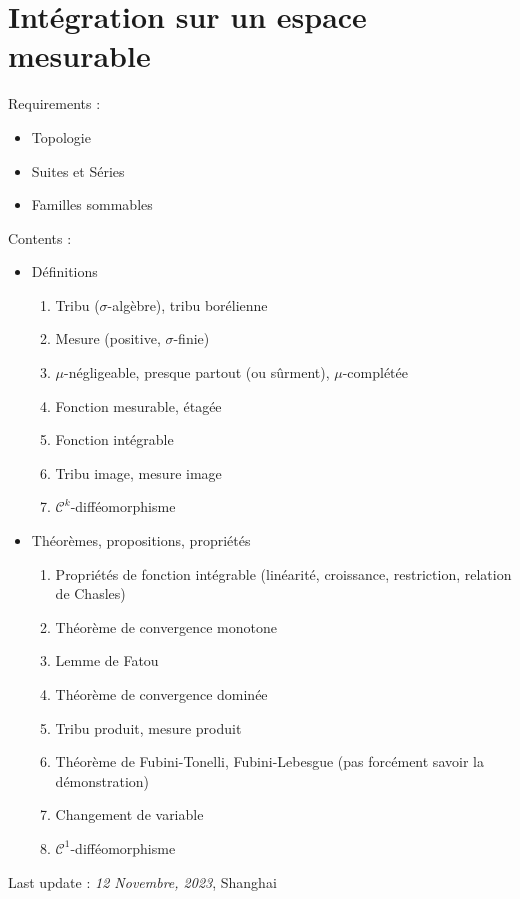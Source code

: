 
\chapter{Intégration sur un espace mesurable} %



\begin{tcolorbox}
Requirements : 
\begin{itemize}

    \item Topologie
    \item Suites et Séries 
    \item Familles sommables

    

\end{itemize}

Contents : 
\begin{itemize}

    \item Définitions
      \begin{enumerate}

          \item Tribu ($\sigma$-algèbre), tribu borélienne
          \item Mesure (positive, $\sigma$-finie)
          \item $\mu$-négligeable, presque partout (ou sûrment), $\mu$-complétée 
          \item Fonction mesurable, étagée
          \item Fonction intégrable
          \item Tribu image, mesure image
          \item $\mathscr{C}^k$-difféomorphisme

      \end{enumerate}

    \item Théorèmes, propositions, propriétés

    \begin{enumerate}
      \item Propriétés de fonction intégrable (linéarité, croissance, restriction, relation de Chasles)
 \item Théorème de convergence monotone
 \item Lemme de Fatou 
  \item Théorème de convergence dominée
  \item Tribu produit, mesure produit
  \item Théorème de Fubini-Tonelli, Fubini-Lebesgue (pas forcément savoir la démonstration)
  \item Changement de variable
  \item $\mathscr{C} ^{1}$-difféomorphisme

    \end{enumerate}

\end{itemize}
Last update : \textit{12 Novembre, 2023}, Shanghai
\end{tcolorbox}

